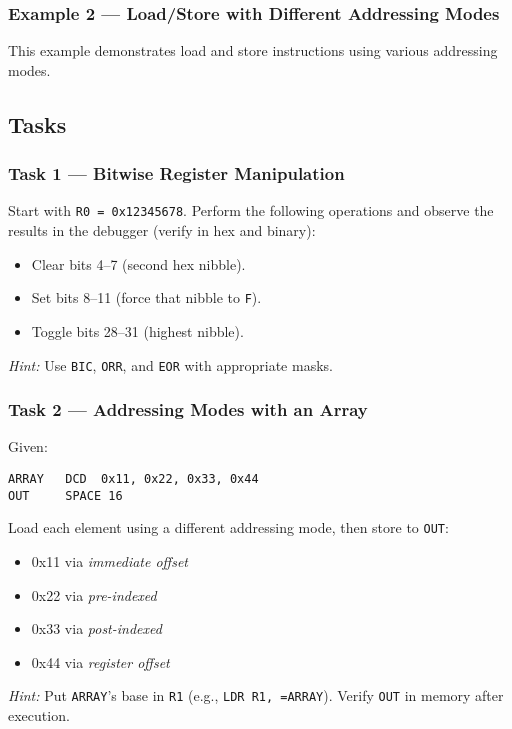 \subsubsection{Example 2 --- Load/Store with Different Addressing Modes}
This example demonstrates load and store instructions using various addressing modes.


\subsection{Tasks}
\subsubsection{Task 1 --- Bitwise Register Manipulation}
Start with \texttt{R0 = 0x12345678}. Perform the following operations and observe the results in the debugger (verify in hex and binary):
\begin{itemize}[nosep]
    \item Clear bits 4--7 (second hex nibble).
    \item Set bits 8--11 (force that nibble to \texttt{F}).
    \item Toggle bits 28--31 (highest nibble).
\end{itemize}
\emph{Hint:} Use \texttt{BIC}, \texttt{ORR}, and \texttt{EOR} with appropriate masks.  

\subsubsection{Task 2 --- Addressing Modes with an Array}
Given:
\begin{lstlisting}
ARRAY   DCD  0x11, 0x22, 0x33, 0x44
OUT     SPACE 16
\end{lstlisting}

Load each element using a different addressing mode, then store to \texttt{OUT}:
\begin{itemize}[nosep]
    \item 0x11 via \emph{immediate offset}
    \item 0x22 via \emph{pre-indexed}       
    \item 0x33 via \emph{post-indexed}       
    \item 0x44 via \emph{register offset}   
\end{itemize}
\emph{Hint:} Put \texttt{ARRAY}'s base in \texttt{R1} (e.g., \texttt{LDR R1, =ARRAY}). Verify \texttt{OUT} in memory after execution.
